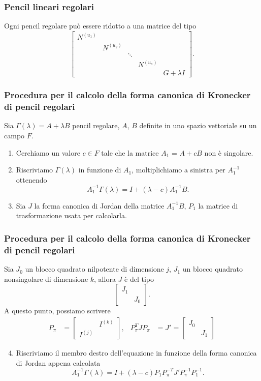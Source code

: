 \begin{frame}
	\frametitle{Pencil lineari regolari}
	\begin{theorem}
		Ogni pencil regolare pu\`o essere ridotto a una matrice del tipo
		\[\begin{bmatrix}
			N^{(u_1)} \\
			& N^{(u_2)} \\
			&& \ddots \\
			&&& N^{(u_s)} \\
			&&&& G + \lambda I
		\end{bmatrix}.\]
	\end{theorem}
\end{frame}


\begin{frame}
	\frametitle{Procedura per il calcolo della forma canonica di Kronecker di pencil regolari}
	Sia $\Gamma(\lambda) = A+\lambda B$ pencil regolare, $A$, $B$ definite in uno spazio
	vettoriale su un campo $F$.
	\begin{enumerate}
		\item {} Cerchiamo un valore $c \in F$ tale che la matrice $A_1$ = $A+cB$
		non \`e singolare.
		\item {} Riscriviamo \(\Gamma(\lambda)\) in funzione di $A_1$,
		moltiplichiamo a sinistra per $A_1^{-1}$ ottenendo
		\[
			A_1^{-1}\Gamma(\lambda) = I + (\lambda - c)A_1^{-1}B.
		\]
		\item {} Sia $J$ la forma canonica di Jordan della matrice $A_1^{-1}B$,
		$P_1$ la matrice di trasformazione usata per calcolarla.
	\end{enumerate}
\end{frame}


\begin{frame}
	\frametitle{Procedura per il calcolo della forma canonica di Kronecker di pencil regolari}
	Sia $J_0$ un blocco quadrato nilpotente di dimensione $j$, $J_1$ un blocco quadrato
	nonsingolare di dimensione $k$, allora $J$ \`e del tipo
	\[
		\begin{bmatrix}
			J_1 \\
			& J_0
		\end{bmatrix}.
	\]
	A questo punto, possiamo scrivere
	\begin{align*}
		P_\pi &= \begin{bmatrix}
			& I^{(k)} \\
			I^{(j)}
		\end{bmatrix}, &
		P_\pi^TJP_\pi &= J' = \begin{bmatrix}
			J_0 \\
			& J_1
		\end{bmatrix}
	\end{align*}
	\begin{enumerate}
		\setcounter{enumi}{3}
		\item {} Riscriviamo il membro destro dell'equazione in funzione della forma
		canonica di Jordan appena calcolata
		\[
			A_{1}^{-1} \Gamma(\lambda) = I + (\lambda - c)P_{1} P_{\pi}^{-T}
			J' P_{\pi}^{-1} P_{1}^{-1}.
		\]
	\end{enumerate}
\end{frame}



